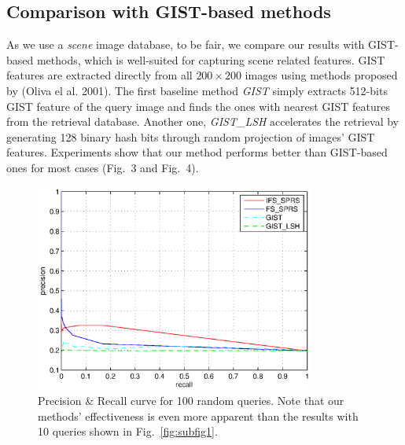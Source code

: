 \documentclass[letterpaper]{article}
\begin{document}
\subsection{Comparison with GIST-based methods}
As we use a \emph{scene} image database, to be fair, we compare our results with GIST-based methods, which is well-suited for capturing scene related features. GIST features are extracted directly from all $200\times 200$ images using methods proposed by (Oliva el al. 2001).
The first baseline method \emph{GIST} simply extracts 512-bits GIST feature of the query image and finds the ones with nearest GIST features from the retrieval database. Another one, \emph{GIST\_LSH} accelerates the retrieval by generating 128 binary hash bits through random projection of images' GIST features. Experiments show that our method performs better than GIST-based ones for most cases (Fig.~3 and Fig.~4).

\begin{figure}[ht]
	\centering
	\includegraphics[width=3.6in]{figures_dir/round4_random100_4comparison_75.eps}
	\caption{Precision \& Recall curve for 100 random queries. Note that our methods' effectiveness is even more apparent than the results with 10 queries shown in Fig.~\ref{fig:subfig1}.}
	\label{random 100 queries}
	
\end{figure}
\end{document}
